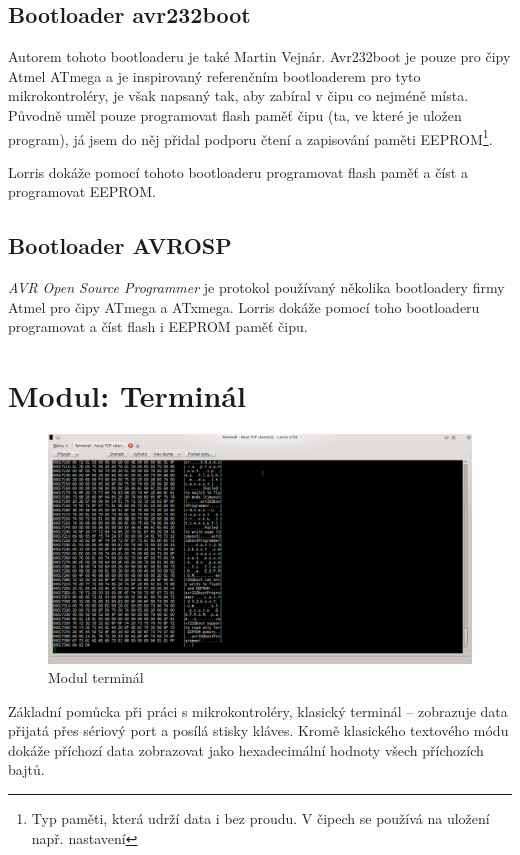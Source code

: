 \documentclass[12pt, a4paper, oneside]{article}
\newcommand{\It}{\textit}  %
\begin{document}
\subsection{Bootloader avr232boot}
Autorem tohoto bootloaderu je také Martin Vejnár. Avr232boot je pouze pro čipy Atmel ATmega a je inspirovaný referenčním bootloaderem pro tyto mikrokontroléry, je však napsaný tak, aby zabíral v čipu co nejméně místa. Původně uměl pouze programovat flash paměť čipu (ta, ve které je uložen program), já jsem do něj přidal podporu čtení a zapisování paměti EEPROM\footnote{Typ paměti, která udrží data i bez proudu. V čipech se používá na uložení např. nastavení}.

Lorris dokáže pomocí tohoto bootloaderu programovat flash paměť a číst a programovat EEPROM.

\subsection{Bootloader AVROSP}
\It{AVR Open Source Programmer} je protokol používaný několika bootloadery firmy Atmel pro čipy ATmega a ATxmega. Lorris dokáže pomocí toho bootloaderu programovat a číst flash i EEPROM paměť čipu.


\newpage
\section{Modul: Terminál}
\begin{figure}[H]
\begin{center}
\includegraphics[width=\textwidth]{img/terminal.png}
\caption{Modul terminál}
\label{Terminal}
\end{center}
\end{figure}
Základní pomůcka při práci s mikrokontroléry, klasický terminál -- zobrazuje data přijatá přes sériový port a posílá stisky kláves. Kromě klasického textového módu dokáže příchozí data zobrazovat jako hexadecimální hodnoty všech příchozích bajtů.
\end{document}
